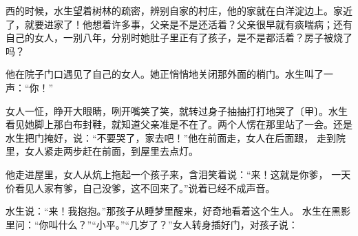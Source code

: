 \documentclass{ctexart}
\renewcommand{\\}{\par}
\begin{document}
西的时候，水生望着树林的疏密，辨别自家的村庄，他的家就在白洋淀边上。家近了，就要进家了！他想着许多事，父亲是不是还活着？父亲很早就有痰喘病；还有自己的女人，一别八年，分别时她肚子里正有了孩子，是不是都活着？房子被烧了吗？\\他在院子门口遇见了自己的女人。她正悄悄地关闭那外面的梢门。水生叫了一声：“你！”\\女人一怔，睁开大眼睛，咧开嘴笑了笑，就转过身子抽抽打打地哭了〔甲〕。水生看见她脚上那白布封鞋，就知道父亲准是不在了。两个人愣在那里站了一会。还是水生把门掩好，说：“不要哭了，家去吧！”他在前面走，女人在后面跟， 走到院里，女人紧走两步赶在前面，到屋里去点灯。\\他走进屋里，女人从炕上拖起一个孩子来，含泪笑着说：“来！这就是你爹， 一天价看见人家有爹，自己没爹，这不回来了。”说着已经不成声音。\\水生说：“来！我抱抱。”那孩子从睡梦里醒来，好奇地看着这个生人。 水生在黑影里问：“你叫什么？”“小平。”“几岁了？”女人转身插好门，对孩子说：
\end{document}
